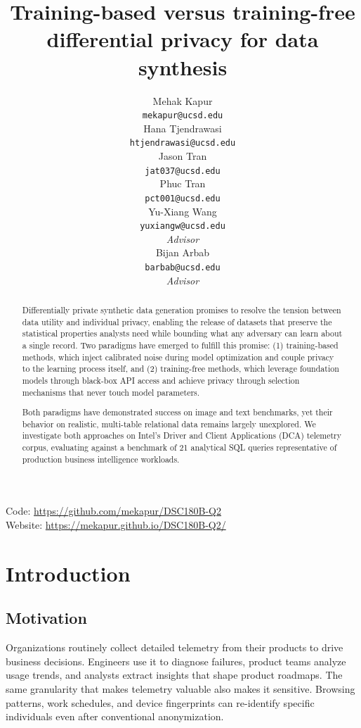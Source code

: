 \documentclass[12pt,letterpaper]{article}
\title{Training-based versus training-free \\ differential privacy for data synthesis}
\author{Mehak Kapur \\
  {\tt mekapur@ucsd.edu} \\\And
  Hana Tjendrawasi  \\
  {\tt htjendrawasi@ucsd.edu} \\\And
  Jason Tran \\
  {\tt jat037@ucsd.edu} \\\And
  Phuc Tran \\
  {\tt pct001@ucsd.edu} \\\And
  Yu-Xiang Wang \\
  {\tt yuxiangw@ucsd.edu} \\
  {\small\textit{Advisor}} \\\And
  Bijan Arbab \\
  {\tt barbab@ucsd.edu} \\
  {\small\textit{Advisor}} \\}
\renewcommand{\_}{\textunderscore\allowbreak}
\begin{document}
\maketitle

\begin{abstract}
Differentially private synthetic data generation promises to resolve the tension between data utility and individual privacy, enabling the release of datasets that preserve the statistical properties analysts need while bounding what any adversary can learn about a single record. Two paradigms have emerged to fulfill this promise: (1) training-based methods, which inject calibrated noise during model optimization and couple privacy to the learning process itself, and (2) training-free methods, which leverage foundation models through black-box API access and achieve privacy through selection mechanisms that never touch model parameters.

Both paradigms have demonstrated success on image and text benchmarks, yet their behavior on realistic, multi-table relational data remains largely unexplored. We investigate both approaches on Intel's Driver and Client Applications (DCA) telemetry corpus, evaluating against a benchmark of 21 analytical SQL queries representative of production business intelligence workloads.
\end{abstract}

\begin{center}
Code: \url{https://github.com/mekapur/DSC180B-Q2} \\
Website: \url{https://mekapur.github.io/DSC180B-Q2/}
\end{center}

\clearpage
\maketoc
\clearpage

\section{Introduction}

\subsection{Motivation}

Organizations routinely collect detailed telemetry from their products to drive business decisions. Engineers use it to diagnose failures, product teams analyze usage trends, and analysts extract insights that shape product roadmaps. The same granularity that makes telemetry valuable also makes it sensitive. Browsing patterns, work schedules, and device fingerprints can re-identify specific individuals even after conventional anonymization.
\end{document}
